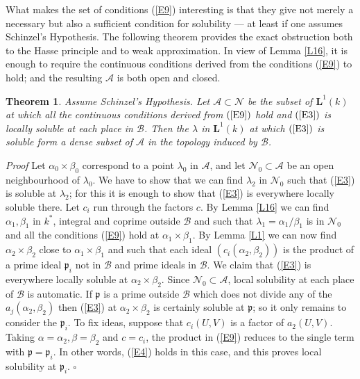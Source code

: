\documentclass[12pt]{article}
\def\bL{{\mathbf L}}
\def\fp{{\mathfrak p}}
\def\ga{{\alpha}}
\def\gb{{\beta}}
\def\gl{{\lambda}}
\def\sA{{\mathcal A}}
\def\sB{{\mathcal B}}
\def\sN{{\mathcal N}}
\def\qed{{\hfill$\square$}}
\def\bth{\begin{theorem} \label}
\def\eth{\end{theorem}}
\newtheorem{theorem}{Theorem}
\begin{document}
What makes the set of conditions (\ref{E9}) interesting is that they give not
merely a necessary but also a sufficient condition for solubility --- at least
if one assumes Schinzel's Hypothesis. The following theorem provides the exact
obstruction both to the Hasse principle and to weak approximation. In view of
Lemma \ref{L16}, it is enough to require the continuous conditions
derived from the conditions (\ref{E9}) to hold; and the
resulting $\sA$ is both open and closed.
\bth{T4} Assume Schinzel's Hypothesis. Let $\sA\subset\sN$ be the subset of
$\bL^1(k)$ at which all the continuous conditions derived from
$(\ref{E9})$ hold and $(\ref{E3})$
is locally soluble at each place in $\sB$. Then the $\gl$ in $\bL^1(k)$ at
which $(\ref{E3})$ is soluble form a dense subset of $\sA$ in the topology
induced by $\sB$.
\eth
\emph{Proof} Let $\ga_0\times\gb_0$ correspond to a point $\gl_0$ in $\sA$,
and let $\sN_0\subset\sA$ be an open neighbourhood of $\gl_0$. We have to show
that we can find $\gl_2$ in $\sN_0$ such that (\ref{E3}) is soluble at $\gl_2$;
for this it is enough to show that (\ref{E3}) is everywhere locally
soluble there. Let $c_i$ run through the factors $c$.
By Lemma \ref{L16} we can find $\ga_1,\gb_1$
in $k^*$, integral and coprime outside $\sB$ and such that
$\gl_1=\ga_1/\gb_1$ is in $\sN_0$ and all the conditions
(\ref{E9}) hold at $\ga_1\times\gb_1$. By Lemma \ref{L1} we
can now find $\ga_2\times\gb_2$ close to $\ga_1\times\gb_1$
and such that each ideal $(c_i(\ga_2,\gb_2))$ is the
product of a prime ideal
$\fp_i$ not in $\sB$ and prime ideals in $\sB$. We claim that
(\ref{E3}) is everywhere locally soluble at $\ga_2\times\gb_2$.
Since $\sN_0\subset\sA$, local solubility at each place of
$\sB$ is automatic. If $\fp$ is a prime outside $\sB$ which
does not divide any of the $a_j(\ga_2,\gb_2)$ then
(\ref{E3}) at $\ga_2\times\gb_2$ is certainly soluble at
$\fp$; so it only remains to consider the
$\fp_i$. To fix ideas, suppose that $c_i(U,V)$ is a factor of
$a_2(U,V)$. Taking $\ga=\ga_2, \gb=\gb_2$ and $c=c_i$, the
product in (\ref{E9}) reduces
to the single term with $\fp=\fp_i$. In other words, (\ref{E4}) holds in this
case, and this proves local solubility at $\fp_i$.  \qed

\medskip
\end{document}
